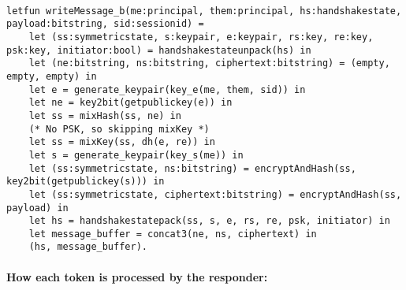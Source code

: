 \begin{lstlisting}

letfun writeMessage_b(me:principal, them:principal, hs:handshakestate, payload:bitstring, sid:sessionid) =
	let (ss:symmetricstate, s:keypair, e:keypair, rs:key, re:key, psk:key, initiator:bool) = handshakestateunpack(hs) in
	let (ne:bitstring, ns:bitstring, ciphertext:bitstring) = (empty, empty, empty) in
	let e = generate_keypair(key_e(me, them, sid)) in
	let ne = key2bit(getpublickey(e)) in
	let ss = mixHash(ss, ne) in
	(* No PSK, so skipping mixKey *)
	let ss = mixKey(ss, dh(e, re)) in
	let s = generate_keypair(key_s(me)) in
	let (ss:symmetricstate, ns:bitstring) = encryptAndHash(ss, key2bit(getpublickey(s))) in
	let (ss:symmetricstate, ciphertext:bitstring) = encryptAndHash(ss, payload) in
	let hs = handshakestatepack(ss, s, e, rs, re, psk, initiator) in
	let message_buffer = concat3(ne, ns, ciphertext) in
	(hs, message_buffer).

\end{lstlisting}

\paragraph{How each token is processed by the responder:}$ $

